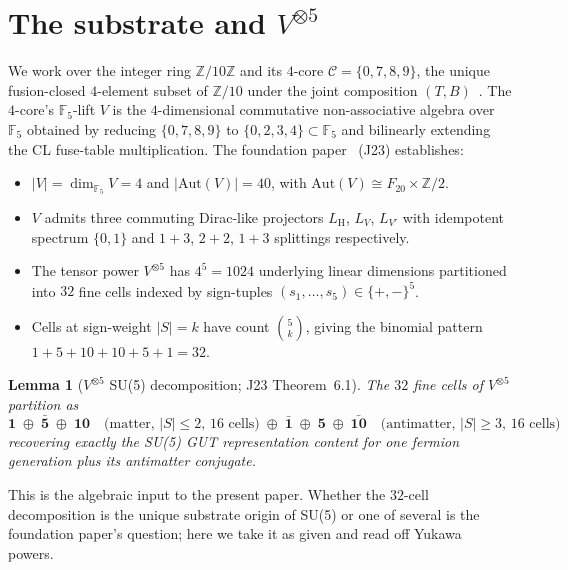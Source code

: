\documentclass[11pt,reqno]{amsart}
\theoremstyle{plain}
\newtheorem{lemma}[theorem]{Lemma}
\theoremstyle{definition}
\theoremstyle{remark}
\newcommand{\Z}{\mathbb{Z}}
\newcommand{\F}{\mathbb{F}}
\newcommand{\Aut}{\mathrm{Aut}}
\DeclareMathOperator{\HARM}{H}    %
\newcommand{\Cfour}{\mathcal{C}}  %
\newcommand{\rep}[1]{\mathbf{#1}}
\newcommand{\barrep}[1]{\bar{\mathbf{#1}}}
\begin{document}
\section{The substrate and \texorpdfstring{$V^{\otimes 5}$}{V tensor 5}}\label{sec:setup}

We work over the integer ring $\Z/10\Z$ and its $4$-core
$\Cfour = \{0, 7, 8, 9\}$, the unique fusion-closed $4$-element
subset of $\Z/10$ under the joint composition $(T,
B)$~\cite{SandersGish2026FourCore}. The $4$-core's $\F_5$-lift
$V$ is the $4$-dimensional commutative non-associative algebra
over $\F_5$ obtained by reducing $\{0,7,8,9\}$ to
$\{0,2,3,4\} \subset \F_5$ and bilinearly extending the CL
fuse-table multiplication. The foundation
paper~\cite{SandersJohnson2026DiscreteDirac} (J23) establishes:

\begin{itemize}\setlength\itemsep{0pt}
\item $|V| = \dim_{\F_5} V = 4$ and $|\Aut(V)| = 40$, with
$\Aut(V) \cong F_{20} \times \Z/2$.
\item $V$ admits three commuting Dirac-like projectors
$L_{\HARM}$, $L_{V}$, $L_{V'}$ with idempotent spectrum
$\{0,1\}$ and $1+3$, $2+2$, $1+3$ splittings respectively.
\item The tensor power $V^{\otimes 5}$ has $4^{5} = 1024$
underlying linear dimensions partitioned into $32$ fine cells
indexed by sign-tuples $(s_{1}, \ldots, s_{5}) \in \{+,-\}^{5}$.
\item Cells at sign-weight $|S| = k$ have count $\binom{5}{k}$,
giving the binomial pattern $1+5+10+10+5+1 = 32$.
\end{itemize}

\begin{lemma}[$V^{\otimes 5}$ SU(5) decomposition; J23 Theorem~6.1]\label{lem:vtensor5}
The $32$ fine cells of $V^{\otimes 5}$ partition as
\[
  \rep{1} \;\oplus\; \barrep{5} \;\oplus\; \rep{10}
  \quad \text{(matter, $|S| \leq 2$, $16$ cells)}
  \;\oplus\;
  \barrep{1} \;\oplus\; \rep{5} \;\oplus\; \barrep{10}
  \quad \text{(antimatter, $|S| \geq 3$, $16$ cells)}
\]
recovering exactly the SU(5) GUT representation content for one
fermion generation plus its antimatter conjugate.
\end{lemma}

This is the algebraic input to the present paper. Whether the
$32$-cell decomposition is the unique substrate origin of SU(5)
or one of several is the foundation paper's question; here we
take it as given and read off Yukawa powers.
\end{document}
